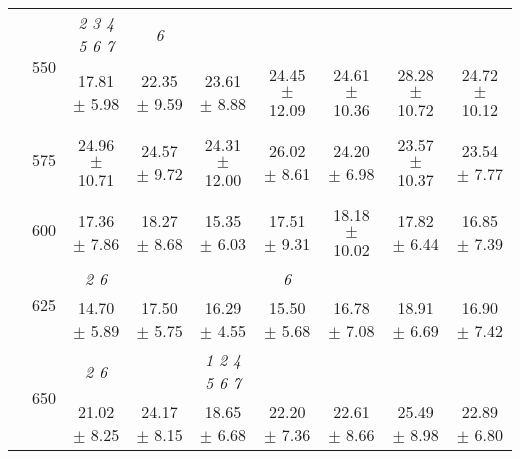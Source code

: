 \begin{table}[h]
{\begin{tabular}{
        ccccccccc}
 & \multirow{2}{*}{550}& \textit{ 2 3 4 5 6 7 }& \textit{ 6 }& & & & &  \\ 
 & & 17.81 $\pm$ 5.98& 22.35 $\pm$ 9.59& 23.61 $\pm$ 8.88& 24.45 $\pm$ 12.09& 24.61 $\pm$ 10.36& 28.28 $\pm$ 10.72& 24.72 $\pm$ 10.12 \\ 
 & \multirow{2}{*}{575}& \cellcolor[HTML]{EFEFEF} & \cellcolor[HTML]{EFEFEF} & \cellcolor[HTML]{EFEFEF} & \cellcolor[HTML]{EFEFEF} & \cellcolor[HTML]{EFEFEF} & \cellcolor[HTML]{EFEFEF} & \cellcolor[HTML]{EFEFEF}  \\ 
 & & \cellcolor[HTML]{EFEFEF} 24.96 $\pm$ 10.71& \cellcolor[HTML]{EFEFEF} 24.57 $\pm$ 9.72& \cellcolor[HTML]{EFEFEF} 24.31 $\pm$ 12.00& \cellcolor[HTML]{EFEFEF} 26.02 $\pm$ 8.61& \cellcolor[HTML]{EFEFEF} 24.20 $\pm$ 6.98& \cellcolor[HTML]{EFEFEF} 23.57 $\pm$ 10.37& \cellcolor[HTML]{EFEFEF} 23.54 $\pm$ 7.77 \\ 
 & \multirow{2}{*}{600}& & & & & & &  \\ 
 & & 17.36 $\pm$ 7.86& 18.27 $\pm$ 8.68& 15.35 $\pm$ 6.03& 17.51 $\pm$ 9.31& 18.18 $\pm$ 10.02& 17.82 $\pm$ 6.44& 16.85 $\pm$ 7.39 \\ 
 & \multirow{2}{*}{625}& \cellcolor[HTML]{EFEFEF} \textit{ 2 6 }& \cellcolor[HTML]{EFEFEF} & \cellcolor[HTML]{EFEFEF} & \cellcolor[HTML]{EFEFEF} \textit{ 6 }& \cellcolor[HTML]{EFEFEF} & \cellcolor[HTML]{EFEFEF} & \cellcolor[HTML]{EFEFEF}  \\ 
 & & \cellcolor[HTML]{EFEFEF} 14.70 $\pm$ 5.89& \cellcolor[HTML]{EFEFEF} 17.50 $\pm$ 5.75& \cellcolor[HTML]{EFEFEF} 16.29 $\pm$ 4.55& \cellcolor[HTML]{EFEFEF} 15.50 $\pm$ 5.68& \cellcolor[HTML]{EFEFEF} 16.78 $\pm$ 7.08& \cellcolor[HTML]{EFEFEF} 18.91 $\pm$ 6.69& \cellcolor[HTML]{EFEFEF} 16.90 $\pm$ 7.42 \\ 
 & \multirow{2}{*}{650}& \textit{ 2 6 }& & \textit{ 1 2 4 5 6 7 }& & & &  \\ 
 & & 21.02 $\pm$ 8.25& 24.17 $\pm$ 8.15& 18.65 $\pm$ 6.68& 22.20 $\pm$ 7.36& 22.61 $\pm$ 8.66& 25.49 $\pm$ 8.98& 22.89 $\pm$ 6.80 \\ \midrule 

        \bottomrule
        \end{tabular}%
        }

        \end{table}
        
